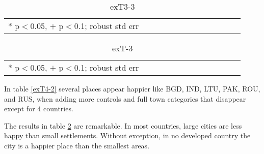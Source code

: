 \documentclass[11pt, letterpaper]{article}
\begin{document}
\begin{spacing}{1.4}
\begin{spacing}{.9} \begin{table}[H]\centering  \label{exT3-3} \begin{scriptsize} \begin{tabular}{p{1.0in}p{.5in}p{.5in}p{.5in}p{.5in}p{.5in}p{.5in}p{.5in}p{.5in}p{.5in}p{.5 in}p{.5in}p{.5 in}}\hline  \hline   * p$<$0.05, $+$ p$<$0.1; robust std err \end{tabular}\end{scriptsize}\caption{exT3-3}\end{table} \end{spacing}

\begin{spacing}{.9} \begin{table}[H]\centering   \begin{scriptsize} \begin{tabular}{p{1.0in}p{.5in}p{.5in}p{.5in}p{.5in}p{.5in}p{.5in}p{.5in}p{.5in}p{.5in}p{.5 in}p{.5in}p{.5 in}}\hline  \hline   * p$<$0.05, $+$ p$<$0.1; robust std err \end{tabular}\end{scriptsize}\caption{\label{exT-3}exT-3}\end{table} \end{spacing}







In table \ref{exT4-2} several places appear happier like BGD, IND, LTU, PAK, ROU, and RUS, when adding more controls and full town categories that disappear except for 4 countries.

The results in table \ref{exT-3} are remarkable. In most countries, large cities are less happy than small settlements. Without exception, in no developed country the city is a happier place than the smallest areas. 


%         


\end{spacing}
\end{document}
